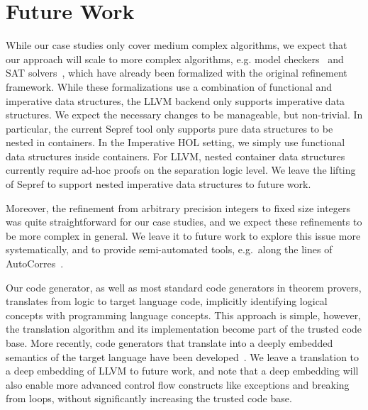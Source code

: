 \documentclass[a4paper,USenglish,cleveref, autoref]{lipics-v2019}
\begin{document}

\section{Future Work}\label{sec:future_work}
While our case studies only cover medium complex algorithms, we expect that our approach will scale to more complex algorithms, e.g.
model checkers~\cite{WiLa18,FBL18} and SAT solvers~\cite{FBL18}, which have already been formalized with the original refinement framework. 
While these formalizations use a combination of functional and imperative data structures, the LLVM backend only supports imperative data structures. 
We expect the necessary changes to be manageable, but non-trivial. 
In particular, the current Sepref tool only supports pure data structures to be nested in containers. In the Imperative HOL setting, we simply 
use functional data structures inside containers. For LLVM, nested container data structures currently require ad-hoc proofs on the separation logic level. We leave the lifting of Sepref to support nested imperative data structures to future work. 

Moreover, the refinement from arbitrary precision integers to fixed size integers was quite straightforward for our case studies, 
and we expect these refinements to be more complex in general.
We leave it to future work to explore this issue more systematically, and to provide semi-automated tools,
e.g.~along the lines of AutoCorres~\cite{GLAK14}.

Our code generator, as well as most standard code generators in theorem provers, 
translates from logic to target language code, implicitly identifying logical 
concepts with programming language concepts. This approach is simple, however, 
the translation algorithm and its implementation become part of the trusted code base.
More recently, code generators that translate into a deeply embedded semantics of the 
target language have been developed~\cite{MyOw14,HuNi18}. 
We leave a translation to a deep embedding of LLVM to future work, and note that a 
deep embedding will also enable more advanced control flow constructs like exceptions and breaking from loops, 
without significantly increasing the trusted code base.
\end{document}
